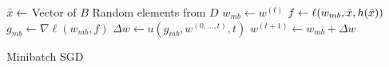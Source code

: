 \begin{algorithm}[h]
    \DontPrintSemicolon
     {
        $\Bar{x}\leftarrow$ Vector of $B$ Random elements from $D$ \;
        $w_{mb}\leftarrow w^{(t)}$ \;
        $f\leftarrow \ell(w_{mb},\Bar{x},h(\Bar{x}))$ \;
        $g_{mb}\leftarrow \nabla \ell(w_{mb}, f)$ \;
        $\Delta w \leftarrow u(g_{mb}, w^{(0,...,t)}, t)$ \;
        $w^{(t+1)}\leftarrow w_{mb} + \Delta w$ \;
    }
    \caption{Minibatch SGD}
    \label{alg:MinibatchSGD}
\end{algorithm}